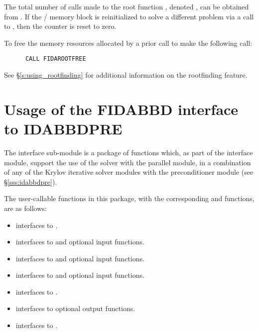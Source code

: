 The total number of calls made to the root function ,
denoted , can be obtained from .
If the {\fida}/{\ida} memory block is reinitialized to solve a
different problem via a call to , then the counter
 is reset to zero.

To free the memory resources allocated by a prior call to  make
the following call:
\begin{verbatim}
      CALL FIDAROOTFREE
\end{verbatim}
See \S\ref{s:using_rootfinding} for additional information on the
rootfinding feature.



\section{Usage of the FIDABBD interface to IDABBDPRE}

The {\fidabbd} interface sub-module is a package of {\C} functions
which, as part of the {\fida} interface module, support the use of the
{\ida} solver with the parallel {\nvecp} module, in a combination of
any of the Krylov iterative solver modules with the {\idabbdpre} preconditioner
module (see \S\ref{sss:idabbdpre}).

The user-callable functions in this package, with the corresponding
{\ida} and {\idabbdpre} functions, are as follows: 
\begin{itemize}
\item {}
  interfaces to .
\item {}
  interfaces to  and {\spgmr} optional input functions.
\item {}
  interfaces to  and {\spbcg} optional input functions.
\item {}
  interfaces to  and {\sptfqmr} optional input functions.
\item {}
  interfaces to .
\item {}
  interfaces to {\idabbdpre} optional output functions.
\item {}
  interfaces to .
\end{itemize}

